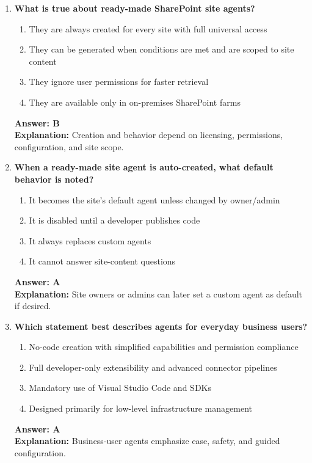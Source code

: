 \documentclass[10pt]{article}
\begin{document}
\begin{enumerate}[leftmargin=*]
\item \textbf{What is true about ready-made SharePoint site agents?}
\begin{enumerate}[label=\Alph*.]
  \item They are always created for every site with full universal access
  \item They can be generated when conditions are met and are scoped to site content
  \item They ignore user permissions for faster retrieval
  \item They are available only in on-premises SharePoint farms
\end{enumerate}
\textbf{Answer: B}\\
\textbf{Explanation:} Creation and behavior depend on licensing, permissions, configuration, and site scope.

\item \textbf{When a ready-made site agent is auto-created, what default behavior is noted?}
\begin{enumerate}[label=\Alph*.]
  \item It becomes the site’s default agent unless changed by owner/admin
  \item It is disabled until a developer publishes code
  \item It always replaces custom agents
  \item It cannot answer site-content questions
\end{enumerate}
\textbf{Answer: A}\\
\textbf{Explanation:} Site owners or admins can later set a custom agent as default if desired.

\item \textbf{Which statement best describes agents for everyday business users?}
\begin{enumerate}[label=\Alph*.]
  \item No-code creation with simplified capabilities and permission compliance
  \item Full developer-only extensibility and advanced connector pipelines
  \item Mandatory use of Visual Studio Code and SDKs
  \item Designed primarily for low-level infrastructure management
\end{enumerate}
\textbf{Answer: A}\\
\textbf{Explanation:} Business-user agents emphasize ease, safety, and guided configuration.


\end{enumerate}
\end{document}
